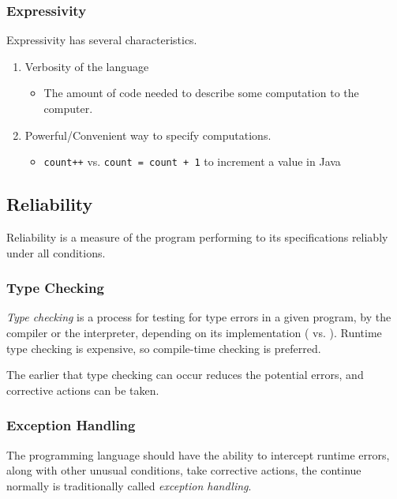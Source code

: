 \subsubsection{Expressivity}\label{subsubsec:Expressivity}
Expressivity has several characteristics.
\begin{enumerate}[noitemsep]
\item Verbosity of the language
  \begin{itemize}[noitemsep]
  \item The amount of code needed to describe some computation to the computer.
  \end{itemize}
\item Powerful/Convenient way to specify computations.
  \begin{itemize}[noitemsep]
  \item \texttt{count++} vs. \texttt{count = count + 1} to increment a value in Java
  \end{itemize}
\end{enumerate}

\subsection{Reliability}\label{subsec:Reliability}
Reliability is a measure of the program performing to its specifications reliably under all conditions.

\subsubsection{Type Checking}\label{subsubsec:Type_Checking}
\begin{definition}\label{def:Type_Checking}
  \emph{Type checking} is a process for testing for type errors in a given program, by the compiler or the interpreter, depending on its implementation ( vs. ).
  Runtime type checking is expensive, so compile-time checking is preferred.
\end{definition}

The earlier that type checking can occur reduces the potential errors, and corrective actions can be taken.

\subsubsection{Exception Handling}\label{subsubsec:Exception_Handling}
The programming language should have the ability to intercept runtime errors, along with other unusual conditions, take corrective actions, the continue normally is traditionally called \emph{exception handling}.

